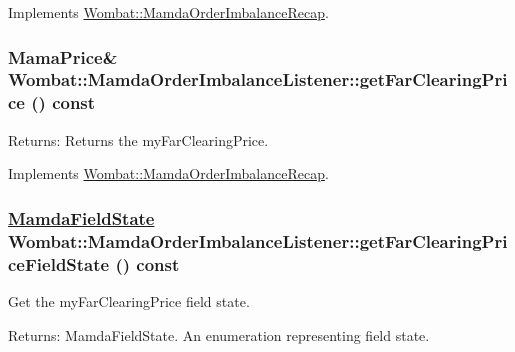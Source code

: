 Implements \hyperlink{classWombat_1_1MamdaOrderImbalanceRecap_3f065a9bdc4535525b7f4842f997ce9c}{Wombat::Mamda\-Order\-Imbalance\-Recap}.\hypertarget{classWombat_1_1MamdaOrderImbalanceListener_f794cdda271d04cc569e18222146e3a6}{
\subsubsection[getFarClearingPrice]{\setlength{\rightskip}{0pt plus 5cm}Mama\-Price\& Wombat::Mamda\-Order\-Imbalance\-Listener::get\-Far\-Clearing\-Price () const}}
\label{classWombat_1_1MamdaOrderImbalanceListener_f794cdda271d04cc569e18222146e3a6}


\begin{Desc}
\item[Returns:]Returns the my\-Far\-Clearing\-Price. \end{Desc}


Implements \hyperlink{classWombat_1_1MamdaOrderImbalanceRecap_0ca93b87f7f9e0dcf21db29dfced88f7}{Wombat::Mamda\-Order\-Imbalance\-Recap}.\hypertarget{classWombat_1_1MamdaOrderImbalanceListener_9a23b7703628b621deed5abcbc1b0e97}{
\subsubsection[getFarClearingPriceFieldState]{\setlength{\rightskip}{0pt plus 5cm}\hyperlink{namespaceWombat_93aac974f2ab713554fd12a1fa3b7d2a}{Mamda\-Field\-State} Wombat::Mamda\-Order\-Imbalance\-Listener::get\-Far\-Clearing\-Price\-Field\-State () const}}
\label{classWombat_1_1MamdaOrderImbalanceListener_9a23b7703628b621deed5abcbc1b0e97}


Get the my\-Far\-Clearing\-Price field state. 

\begin{Desc}
\item[Returns:]Mamda\-Field\-State. An enumeration representing field state. \end{Desc}


